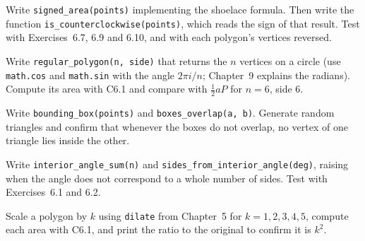 \begin{codeexercises}
\item Write \lstinline!signed_area(points)! implementing the shoelace formula. Then write the function \lstinline!is_counterclockwise(points)!, which reads the sign of that result. Test with Exercises~6.7, 6.9 and 6.10, and with each polygon's vertices reversed.
\item Write \lstinline!regular_polygon(n, side)! that returns the $n$ vertices on a circle (use \lstinline!math.cos! and \lstinline!math.sin! with the angle $2\pi i / n$; Chapter~9 explains the radians). Compute its area with C6.1 and compare with $\tfrac{1}{2}aP$ for $n = 6$, side $6$.
\item Write \lstinline!bounding_box(points)! and \lstinline!boxes_overlap(a, b)!. Generate random triangles and confirm that whenever the boxes do not overlap, no vertex of one triangle lies inside the other.
\item Write \lstinline!interior_angle_sum(n)! and \lstinline!sides_from_interior_angle(deg)!, raising when the angle does not correspond to a whole number of sides. Test with Exercises~6.1 and 6.2.
\item Scale a polygon by $k$ using \lstinline!dilate! from Chapter~5 for $k = 1, 2, 3, 4, 5$, compute each area with C6.1, and print the ratio to the original to confirm it is $k^2$.
\end{codeexercises}
